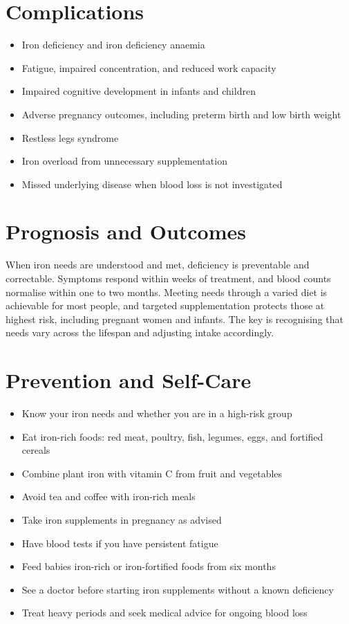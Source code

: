 \section*{Complications}
\begin{itemize}
    \item Iron deficiency and iron deficiency anaemia
    \item Fatigue, impaired concentration, and reduced work capacity
    \item Impaired cognitive development in infants and children
    \item Adverse pregnancy outcomes, including preterm birth and low birth weight
    \item Restless legs syndrome
    \item Iron overload from unnecessary supplementation
    \item Missed underlying disease when blood loss is not investigated
\end{itemize}

\section*{Prognosis and Outcomes}
When iron needs are understood and met, deficiency is preventable and correctable. Symptoms respond within weeks of treatment, and blood counts normalise within one to two months. Meeting needs through a varied diet is achievable for most people, and targeted supplementation protects those at highest risk, including pregnant women and infants. The key is recognising that needs vary across the lifespan and adjusting intake accordingly.

\section*{Prevention and Self-Care}
\begin{itemize}
    \item Know your iron needs and whether you are in a high-risk group
    \item Eat iron-rich foods: red meat, poultry, fish, legumes, eggs, and fortified cereals
    \item Combine plant iron with vitamin C from fruit and vegetables
    \item Avoid tea and coffee with iron-rich meals
    \item Take iron supplements in pregnancy as advised
    \item Have blood tests if you have persistent fatigue
    \item Feed babies iron-rich or iron-fortified foods from six months
    \item See a doctor before starting iron supplements without a known deficiency
    \item Treat heavy periods and seek medical advice for ongoing blood loss
\end{itemize}

